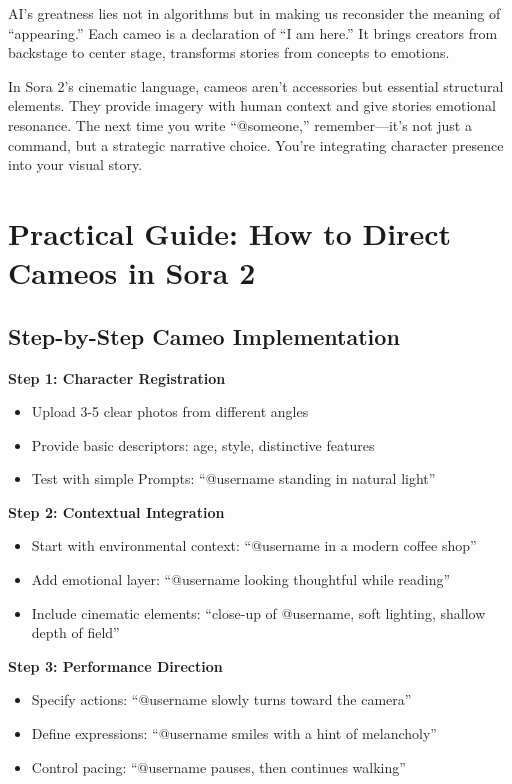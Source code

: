 AI's greatness lies not in algorithms but in making us reconsider the meaning of ``appearing.'' Each cameo is a declaration of ``I am here.'' It brings creators from backstage to center stage, transforms stories from concepts to emotions.

In Sora 2's cinematic language, cameos aren't accessories but essential structural elements. They provide imagery with human context and give stories emotional resonance. The next time you write ``@someone,'' remember—it's not just a command, but a strategic narrative choice. You're integrating character presence into your visual story.

\section{Practical Guide: How to Direct Cameos in Sora 2}
\label{sec:cameo-practical-guide}

\subsection{Step-by-Step Cameo Implementation}

\textbf{Step 1: Character Registration}
\begin{itemize}
\item Upload 3-5 clear photos from different angles
\item Provide basic descriptors: age, style, distinctive features
\item Test with simple Prompts: ``@username standing in natural light''
\end{itemize}

\textbf{Step 2: Contextual Integration}
\begin{itemize}
\item Start with environmental context: ``@username in a modern coffee shop''
\item Add emotional layer: ``@username looking thoughtful while reading''
\item Include cinematic elements: ``close-up of @username, soft lighting, shallow depth of field''
\end{itemize}

\textbf{Step 3: Performance Direction}
\begin{itemize}
\item Specify actions: ``@username slowly turns toward the camera''
\item Define expressions: ``@username smiles with a hint of melancholy''
\item Control pacing: ``@username pauses, then continues walking''
\end{itemize}

